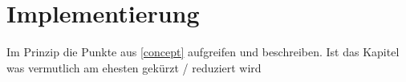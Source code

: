 \chapter{Implementierung}
\label{implementation}
Im Prinzip die Punkte aus \ref{concept} aufgreifen und beschreiben. Ist das Kapitel was vermutlich am ehesten gekürzt / reduziert wird
